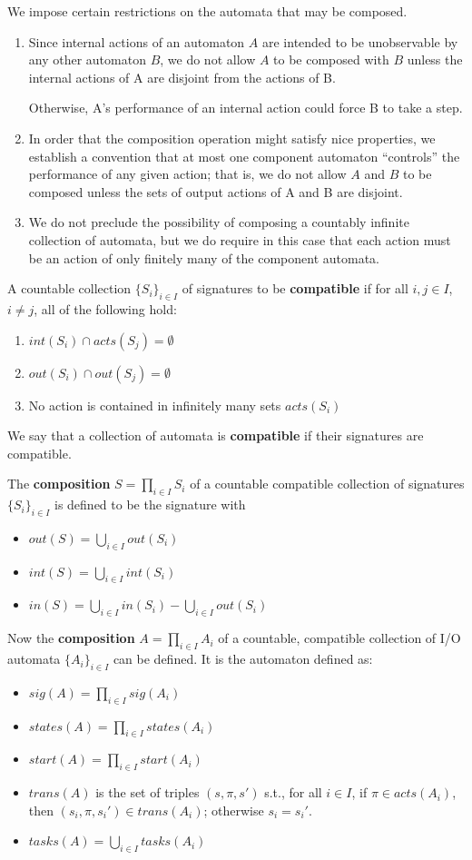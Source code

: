\documentclass[11pt]{article}
\begin{document}
We impose certain restrictions on the automata that may be composed.
\begin{enumerate}
\item Since internal actions of an automaton \(A\) are intended to be unobservable by any other automaton
\(B\), we do not allow \(A\) to be composed with \(B\) unless the internal actions of A are
disjoint from the actions of B.

Otherwise, A's performance of an internal action could force B to take a step.
\item In order that the composition operation might satisfy nice properties, we establish a convention
that at most one component automaton ``controls'' the performance of any given action; that is, we do
not allow \(A\) and \(B\) to be composed unless the sets of output actions of A and B are disjoint.
\item We do not preclude the possibility of composing a countably infinite collection of automata, but we
do require in this case that each action must be an action of only finitely many of the component automata.
\end{enumerate}

A countable collection \(\{S_i\}_{i\in I}\) of signatures to be \textbf{compatible} if for all \(i,j\in I\),
\(i\neq j\), all of the following hold:
\begin{enumerate}
\item \(int(S_i)\cap acts(S_j)=\emptyset\)
\item \(out(S_i)\cap out(S_j)=\emptyset\)
\item No action is contained in infinitely many sets \(acts(S_i)\)
\end{enumerate}
We say that a collection of automata is \textbf{compatible} if their signatures are compatible.

The \textbf{composition} \(S=\prod_{i\in I}S_i\) of a countable compatible collection of signatures
\(\{S_i\}_{i\in I}\) is defined to be the signature with
\begin{itemize}
\item \(out(S)=\bigcup_{i\in I}out(S_i)\)
\item \(int(S)=\bigcup_{i\in I}int(S_i)\)
\item \(in(S)=\bigcup_{i\in I}in(S_i)-\bigcup_{i\in I}out(S_i)\)
\end{itemize}

Now the \textbf{composition} \(A=\prod_{i\in I}A_i\) of a countable, compatible collection of I/O automata
\(\{A_i\}_{i\in I}\) can be defined. It is the automaton defined as:
\begin{itemize}
\item \(sig(A)=\prod_{i\in I}sig(A_i)\)
\item \(states(A)=\prod_{i\in I}states(A_i)\)
\item \(start(A)=\prod_{i\in I}start(A_i)\)
\item \(trans(A)\) is the set of triples \((s,\pi,s')\) s.t., for all \(i\in I\), if \(\pi\in acts(A_i)\),
then \((s_i,\pi,s_i')\in trans(A_i)\); otherwise \(s_i=s_i'\).
\item \(tasks(A)=\bigcup_{i\in I}tasks(A_i)\)
\end{itemize}
\end{document}
